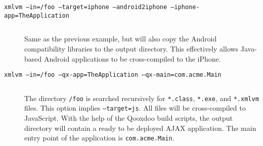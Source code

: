 \documentclass[12pt]{article}
\begin{document}
\begin{description}
\item[\texttt{xmlvm --in=/foo --target=iphone --android2iphone --iphone-app=TheApplication}] $ $

  Same as the previous example, but will also copy the Android
  compatibility libraries to the output directory. This effectively
  allows Java-based Android applications to be cross-compiled to the
  iPhone.

\item[\texttt{xmlvm --in=/foo --qx-app=TheApplication
    --qx-main=com.acme.Main}] $ $

  The directory \texttt{/foo} is searched recursively for
  \texttt{*.class}, \texttt{*.exe}, and \texttt{*.xmlvm} files. This
  option implies \texttt{--target=js}. All files will be
  cross-compiled to JavaScript. With the help of the Qooxdoo build
  scripts, the output directory will contain a ready to be deployed
  AJAX application. The main entry point of the application is
  \texttt{com.acme.Main}.

\end{description}


\end{document}
